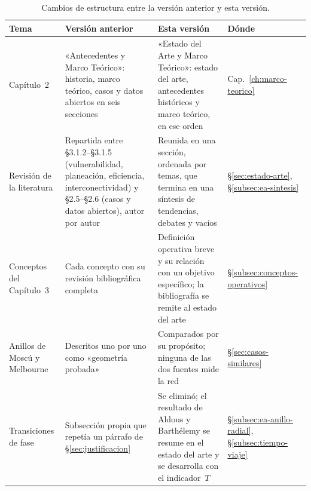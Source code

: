 \begin{table}[H]
\centering
\caption[Cambios de estructura entre versiones]{Cambios de estructura entre la
versión anterior y esta versión.}
\label{tab:nota-version-estructura}
\small
\begin{tabularx}{\textwidth}{>{\raggedright\arraybackslash}p{2.3cm}
  >{\raggedright\arraybackslash}X >{\raggedright\arraybackslash}X
  >{\raggedright\arraybackslash}p{2.1cm}}
\toprule
\textbf{Tema} & \textbf{Versión anterior} & \textbf{Esta versión} &
\textbf{Dónde} \\
\midrule
Capítulo~2
  & «Antecedentes y Marco Teórico»: historia, marco teórico, casos y datos
    abiertos en seis secciones
  & «Estado del Arte y Marco Teórico»: estado del arte, antecedentes
    históricos y marco teórico, en ese orden
  & Cap.~\ref{ch:marco-teorico} \\
Revisión de la literatura
  & Repartida entre §3.1.2--§3.1.5 (vulnerabilidad, planeación, eficiencia,
    interconectividad) y §2.5--§2.6 (casos y datos abiertos), autor por autor
  & Reunida en una sección, ordenada por temas, que termina en una síntesis
    de tendencias, debates y vacíos
  & §\ref{sec:estado-arte}, §\ref{subsec:ea-sintesis} \\
Conceptos del Capítulo~3
  & Cada concepto con su revisión bibliográfica completa
  & Definición operativa breve y su relación con un objetivo específico; la
    bibliografía se remite al estado del arte
  & §\ref{subsec:conceptos-operativos} \\
Anillos de Moscú y Melbourne
  & Descritos uno por uno como «geometría probada»
  & Comparados por su propósito; ninguna de las dos fuentes mide la red
  & §\ref{sec:casos-similares} \\
Transiciones de fase
  & Subsección propia que repetía un párrafo de
    §\ref{sec:justificacion}
  & Se eliminó; el resultado de Aldous y Barthélemy se resume en el estado
    del arte y se desarrolla con el indicador~$T$
  & §\ref{subsec:ea-anillo-radial}, §\ref{subsec:tiempo-viaje} \\
\bottomrule
\end{tabularx}
\end{table}
